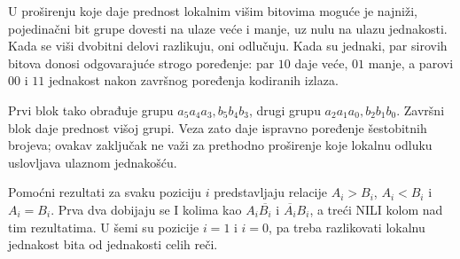 U proširenju koje daje prednost lokalnim višim bitovima moguće je najniži, pojedinačni bit grupe dovesti na ulaze veće i manje, uz nulu na ulazu jednakosti. Kada se viši dvobitni delovi razlikuju, oni odlučuju. Kada su jednaki, par sirovih bitova donosi odgovarajuće strogo poređenje: par $10$ daje veće, $01$ manje, a parovi $00$ i $11$ jednakost nakon završnog poređenja kodiranih izlaza.

Prvi blok tako obrađuje grupu $a_5a_4a_3,b_5b_4b_3$, drugi grupu $a_2a_1a_0,b_2b_1b_0$. Završni blok daje prednost višoj grupi. Veza zato daje ispravno poređenje šestobitnih brojeva; ovakav zaključak ne važi za prethodno proširenje koje lokalnu odluku uslovljava ulaznom jednakošću.

Pomoćni rezultati za svaku poziciju $i$ predstavljaju relacije $A_i>B_i$, $A_i<B_i$ i $A_i=B_i$. Prva dva dobijaju se I kolima kao $A_i\overline{B_i}$ i $\overline{A_i}B_i$, a treći NILI kolom nad tim rezultatima. U šemi su pozicije $i=1$ i $i=0$, pa treba razlikovati lokalnu jednakost bita od jednakosti celih reči.
